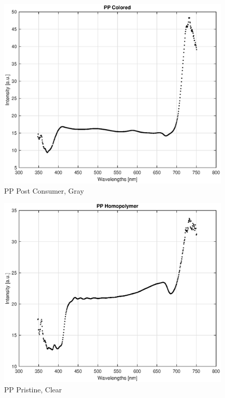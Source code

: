 \begin{appendices}
\begin{figure}
    \centering
    \includegraphics[width = 12cm]{Images/appendix/pp-postconsum-gray.eps}
    \caption[$\; \:$PP Post Consumer]{PP Post Consumer, Gray}
\end{figure}

\begin{figure}
    \centering
    \includegraphics[width = 12cm]{Images/appendix/pp-pristine-clear.eps}
    \caption[$\; \:$PP Pristine]{PP Pristine, Clear}
\end{figure}


\end{appendices}
